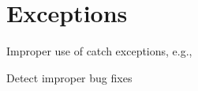 
\chapter{Exceptions} \label{cha:exceptions}

Improper use of catch exceptions, e.g., \npe{}

Detect improper bug fixes
